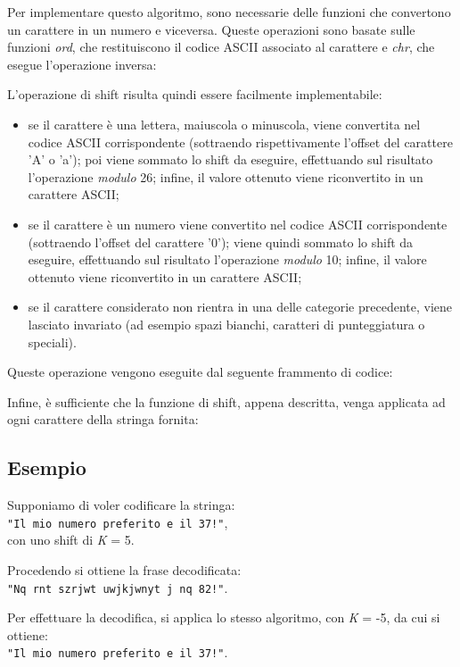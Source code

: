 Per implementare questo algoritmo, sono necessarie delle funzioni che convertono un carattere in un numero e viceversa. Queste operazioni sono basate sulle funzioni \textit{ord}, che restituiscono il codice ASCII associato al carattere e \textit{chr}, che esegue l'operazione inversa:


L'operazione di shift risulta quindi essere facilmente implementabile:
\begin{itemize}
	\item se il carattere è una lettera, maiuscola o minuscola, viene convertita nel codice ASCII corrispondente (sottraendo rispettivamente l'offset del carattere 'A' o 'a'); poi viene sommato lo shift da eseguire, effettuando sul risultato l'operazione \textit{modulo} 26; infine, il valore ottenuto viene riconvertito in un carattere ASCII;
	\item se il carattere è un numero viene convertito nel codice ASCII corrispondente (sottraendo l'offset del carattere '0'); viene quindi sommato lo shift da eseguire, effettuando sul risultato l'operazione \textit{modulo} 10; infine, il valore ottenuto viene riconvertito in un carattere ASCII;
	\item se il carattere considerato non rientra in una delle categorie precedente, viene lasciato invariato (ad esempio spazi bianchi, caratteri di punteggiatura o speciali).
\end{itemize}
Queste operazione vengono eseguite dal seguente frammento di codice:


Infine, è sufficiente che la funzione di shift, appena descritta, venga applicata ad ogni carattere della stringa fornita:


\subsection{Esempio}
Supponiamo di voler codificare la stringa: \\
\texttt{"Il mio numero preferito e il 37!"}, \\
con uno shift di \textit{K} = 5.

Procedendo si ottiene la frase decodificata: \\
\texttt{"Nq rnt szrjwt uwjkjwnyt j nq 82!"}.

Per effettuare la decodifica, si applica lo stesso algoritmo, con \textit{K} = -5, da cui si ottiene: \\
\texttt{"Il mio numero preferito e il 37!"}.
